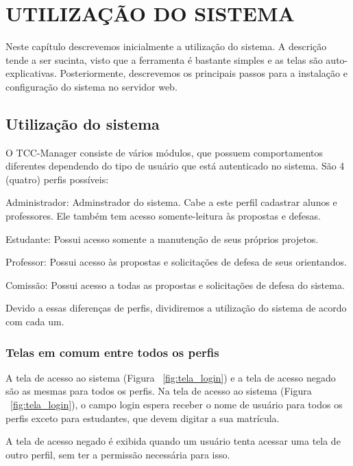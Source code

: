 \chapter{UTILIZAÇÃO DO SISTEMA}
\label{cha:utilizacao}

Neste capítulo descrevemos inicialmente a utilização do sistema. A descrição tende
a ser sucinta, visto que a ferramenta é bastante simples e as telas são auto-explicativas.
Posteriormente, descrevemos os principais passos para a instalação e configuração
do sistema no servidor web.

\section{Utilização do sistema}
O TCC-Manager consiste de vários módulos, que possuem comportamentos diferentes dependendo do 
tipo de usuário que está autenticado no sistema. São 4 (quatro) perfis possíveis:

\begin{list}
{}
\item Administrador: Adminstrador do sistema. Cabe a este perfil cadastrar alunos e professores.
Ele também tem acesso somente-leitura às propostas e defesas.
\item Estudante: Possui acesso somente a manutenção de seus próprios projetos.
\item Professor: Possui acesso às propostas e solicitações de defesa de seus orientandos.
\item Comissão: Possui acesso a todas as propostas e solicitações de defesa do sistema.
\end{list}

Devido a essas diferenças de perfis, dividiremos a utilização do sistema de acordo com cada um.

\subsection{Telas em comum entre todos os perfis}
A tela de acesso ao sistema (Figura ~\ref{fig:tela_login}) e a tela de acesso negado são as mesmas para todos os perfis.
Na tela de acesso ao sistema (Figura ~\ref{fig:tela_login}), o campo login espera receber o nome de usuário
para todos os perfis exceto para estudantes, que devem digitar a sua matrícula.

A tela de acesso negado é exibida quando um usuário tenta acessar uma tela de outro perfil, sem
ter a permissão necessária para isso.

